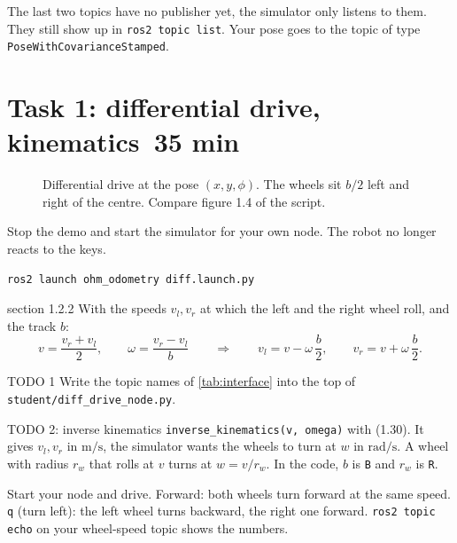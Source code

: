 \documentclass[11pt,a4paper,parskip=half]{scrartcl}
\newcommand{\thema}[1]{\texttt{#1}}
\newcommand{\datei}[1]{\texttt{#1}}
\newcommand{\minutes}[1]{\hfill{\normalsize\mdseries\color{ohmgrey}\faClock[regular]~#1 min}}
\begin{document}
\begin{note}
The last two topics have no publisher yet, the simulator only listens to them. They still show up in
\thema{ros2 topic list}. Your pose goes to the topic of type \thema{PoseWithCovarianceStamped}.
\end{note}

\newpage
\section{Task 1: differential drive, kinematics\minutes{35}}
\label{sec:task1}
\begin{figure}[ht]
  \centering
  
  \caption{Differential drive at the pose \((x, y, \phi)\). The wheels sit \(b/2\) left and right of the
    centre. Compare figure 1.4 of the script.}
  \label{fig:diff}
\end{figure}

Stop the demo and start the simulator for your own node. The robot no longer reacts to the keys.
\begin{lstlisting}
ros2 launch ohm_odometry diff.launch.py
\end{lstlisting}

\begin{script}{section 1.2.2}
With the speeds \(v_l, v_r\) at which the left and the right wheel roll, and the track \(b\):
\begin{equation}
  v = \frac{v_r + v_l}{2}, \qquad \omega = \frac{v_r - v_l}{b}
  \qquad\Rightarrow\qquad
  v_l = v - \omega\,\frac b2, \qquad v_r = v + \omega\,\frac b2 .
  \tag{1.30}
\end{equation}
\end{script}

\begin{todo}{TODO 1}
Write the topic names of \cref{tab:interface} into the top of \datei{student/diff\_drive\_node.py}.
\end{todo}

\begin{todo}{TODO 2: inverse kinematics}
\thema{inverse\_kinematics(v, omega)} with (1.30). It gives \(v_l, v_r\) in \(\mathrm{m/s}\), the
simulator wants the wheels to turn at \(w\) in \(\mathrm{rad/s}\). A wheel with radius \(r_w\) that
rolls at \(v\) turns at \(w = v / r_w\). In the code, \(b\) is \thema{B} and \(r_w\) is \thema{R}.
\end{todo}

Start your node and drive. Forward: both wheels turn forward at the same speed. \thema{q} (turn
left): the left wheel turns backward, the right one forward. \thema{ros2 topic echo} on your
wheel-speed topic shows the numbers.
\end{document}
